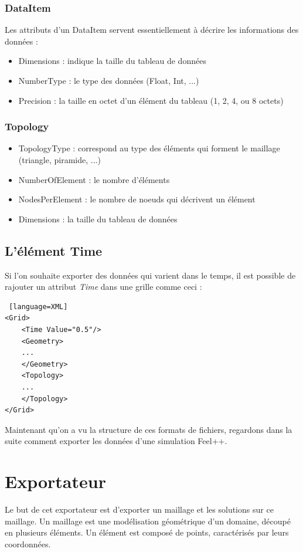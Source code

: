 \documentclass[12pt]{article}
\begin{document}
\subsubsection {DataItem}
Les attributs d'un DataItem servent essentiellement à décrire les informations des données :
\begin{itemize}
\item Dimensions : indique la taille du tableau de données
\item NumberType : le type des données (Float, Int, ...)
\item Precision : la taille en octet d'un élément du tableau (1, 2, 4, ou 8 octets)
\end{itemize}
\subsubsection {Topology}
\begin{itemize}
\item TopologyType : correspond au type des éléments qui forment le maillage (triangle, piramide, ...)
\item NumberOfElement : le nombre d'éléments
\item NodesPerElement : le nombre de noeuds qui décrivent un élément
\item Dimensions : la taille du tableau de données
\end{itemize}
\subsection {L'élément Time}
Si l'on souhaite exporter des données qui varient dans le temps, il est possible de rajouter un attribut \emph{Time} dans une grille comme ceci :
\begin{lstlisting} [language=XML]
<Grid>
    <Time Value="0.5"/>
    <Geometry>
    ...
    </Geometry>
    <Topology>
    ...
    </Topology>
</Grid>
\end{lstlisting}
\newpage
Maintenant qu'on a vu la structure de ces formats de fichiers, regardons dans la suite comment exporter les données d'une simulation Feel++.
\section {Exportateur}
Le but de cet exportateur est d'exporter un maillage et les solutions sur ce maillage. Un maillage est une modélisation géométrique d'un domaine, découpé en plusieurs éléments. Un élément est composé de points, caractérisés par leurs coordonnées. 
\end{document}
